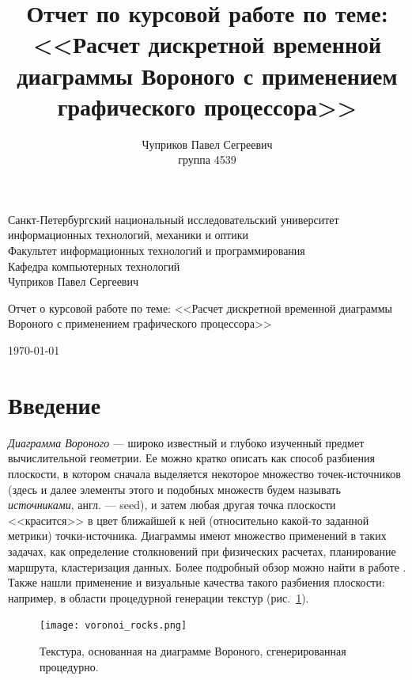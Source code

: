 \documentclass[12pt]{article}
\author{Чуприков Павел Сегреевич \\ группа 4539\\}
\title{Отчет по курсовой работе по теме: <<Расчет дискретной временной диаграммы 
Вороного с применением графического процессора>>}
\begin{document}
\begin{titlepage}
\thispagestyle{empty}
\begin{center}
Санкт-Петербургский 
национальный исследовательский университет информационных технологий,
механики и оптики\\
\smallskip
Факультет информационных технологий и программирования\\
\smallskip
Кафедра компьютерных технологий\\
\vspace{2cm}
\large{Чуприков Павел Сергеевич}\\
\vspace{1cm}
\begin{LARGE}
Отчет о курсовой работе по теме: <<Расчет дискретной временной диаграммы 
Вороного с применением графического процессора>>\\
\end{LARGE}
\vfill
\today
\end{center}
\end{titlepage}
\setcounter{page}{2}
\tableofcontents

\pagebreak

\section{Введение}
\emph{Диаграмма Вороного} --- широко известный и глубоко изученный предмет
вычислительной геометрии. Ее можно кратко описать как способ разбиения
плоскости, в котором сначала выделяется некоторое множество точек-источников
(здесь и далее элементы этого и подобных множеств будем называть \emph{источниками},
англ. --- seed), и затем любая другая точка плоскости <<красится>> в цвет ближайшей к ней 
(относительно какой-то заданной метрики) точки-источника. 
Диаграммы имеют множество применений в таких
задачах, как определение столкновений при физических расчетах, 
планирование маршрута, кластеризация данных. Более подробный обзор 
можно найти в работе \cite{survey}. Также нашли применение и визуальные качества такого
разбиения плоскости: например, в области процедурной генерации текстур \cite{proced} (рис.~\ref{rocks}). 

\begin{figure}
\begin{center}
\texttt{[image: voronoi\_rocks.png]}
\end{center}
\caption{Текстура, основанная на диаграмме Вороного, сгенерированная процедурно.}
\label{rocks}
\end{figure}
\end{document}
